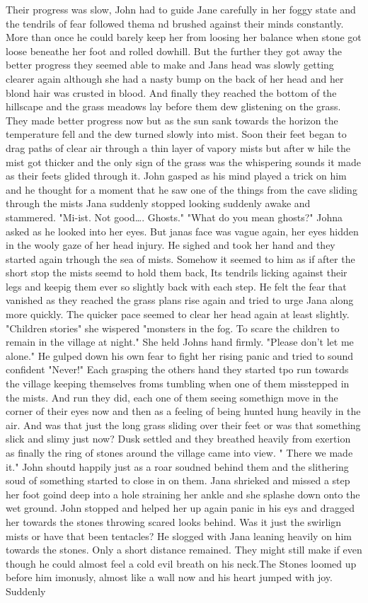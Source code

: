 Their progress was slow, John had to guide Jane carefully in her foggy state and the tendrils of fear followed thema nd brushed against their minds constantly. More than once he could barely keep her from loosing her balance when stone got loose beneathe her foot and rolled dowhill.  But the further they got away the better progress they seemed able to make and Jans head was slowly getting clearer again although she had a nasty bump on the back of her head and her blond hair was crusted in blood. And finally they reached the bottom of the hillscape and the grass meadows lay before them dew glistening on the grass. They made better progress now but as the sun sank towards the horizon the temperature fell and the dew turned slowly into mist. Soon their feet began to drag paths of clear air through a thin layer of vapory mists but after w hile the mist got thicker and the only sign of the grass was the whispering sounds it made as their feets glided through it. John gasped as his mind played a trick on him and he thought for a moment that he saw one of the things from the cave sliding through the mists Jana suddenly stopped looking suddenly awake  and stammered. "Mi-ist. Not good\dots. Ghosts." "What do you mean ghosts?" Johna asked as he looked into her eyes. But janas face was vague again, her eyes hidden in the wooly gaze of her head injury. He sighed and took her hand and they started again trhough the sea of mists. Somehow it seemed to him as if after the short stop the mists seemd to hold them back, Its tendrils licking against their legs and keepig them ever so slightly back with each step. He felt the fear that vanished as they reached the grass plans rise again and tried to urge Jana along more quickly. The quicker pace seemed to clear her head again at least slightly. "Children stories" she wispered "monsters in the fog. To scare the children to remain in the village at night." She held Johns hand firmly. "Please don't let me alone." He gulped down his own fear to fight her rising panic and tried to sound confident "Never!" Each grasping the others hand they started tpo run towards the village keeping themselves froms tumbling when one of them misstepped in the mists. And run they did, each one of them seeing somethign move in the corner of their eyes now and then as a feeling of being hunted hung heavily in the air. And was that just the long grass sliding over their feet or was that something slick and slimy just now? Dusk settled and they breathed heavily from exertion as finally the ring of stones around the village came into view. " There we made it." John shoutd happily just as a roar soudned behind them and the slithering soud of something started to close in on them. Jana shrieked and missed a step her foot goind deep into a hole straining her ankle and she splashe down onto the wet ground. John stopped and helped her up again panic in his eys and dragged her towards the stones throwing scared looks behind. Was it just the swirlign mists or have that been tentacles? He slogged with Jana leaning heavily on him towards the stones. Only a short distance remained. They might still make if even though he could almost feel a cold evil breath on his neck.The Stones loomed up before him imonusly, almost like a wall now and his heart jumped with joy. Suddenly 